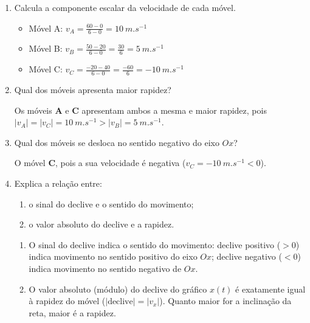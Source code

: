 \documentclass[11pt,a4paper]{article}
\begin{document}
	\begin{enumerate}[label=\textbf{\arabic*.},resume]
		
		\item Calcula a componente escalar da velocidade de cada móvel.
		
		\begin{solucao}
			\begin{itemize}
				\item Móvel A: $v_A = \frac{60 - 0}{6 - 0} = \SI{10}{m.s^{-1}}$
				\item Móvel B: $v_B = \frac{50 - 20}{6 - 0} = \frac{30}{6} = \SI{5}{m.s^{-1}}$
				\item Móvel C: $v_C = \frac{-20 - 40}{6 - 0} = \frac{-60}{6} = \SI{-10}{m.s^{-1}}$
			\end{itemize}
		\end{solucao}
		
		\item Qual dos móveis apresenta maior rapidez?
		
		\begin{solucao}
			Os móveis \textbf{A} e \textbf{C} apresentam ambos a mesma e maior rapidez, pois $|v_A| = |v_C| = \SI{10}{m.s^{-1}} > |v_B| = \SI{5}{m.s^{-1}}$.
		\end{solucao}
		
		\item Qual dos móveis se desloca no sentido negativo do eixo $Ox$?
		
		\begin{solucao}
			O móvel \textbf{C}, pois a sua velocidade é negativa ($v_C = \SI{-10}{m.s^{-1}} < 0$).
		\end{solucao}
		
		\item Explica a relação entre:
		
		\begin{enumerate}[label=\alph*)]
			\item o sinal do declive e o sentido do movimento;
			\item o valor absoluto do declive e a rapidez.
		\end{enumerate}
		
		\begin{solucao}
			\begin{enumerate}[label=\alph*)]
				\item O sinal do declive indica o sentido do movimento: declive positivo ($>0$) indica movimento no sentido positivo do eixo $Ox$; declive negativo ($<0$) indica movimento no sentido negativo de $Ox$.
				\item O valor absoluto (módulo) do declive do gráfico $x(t)$ é exatamente igual à rapidez do móvel ($|\text{declive}| = |v_x|$). Quanto maior for a inclinação da reta, maior é a rapidez.
			\end{enumerate}
		\end{solucao}
		
	\end{enumerate}
	
\end{document}
